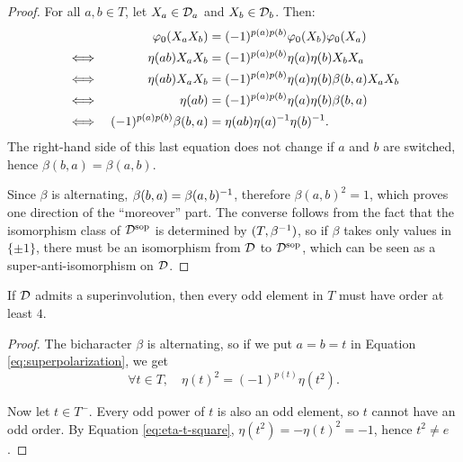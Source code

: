 \begin{proof}
    For all $a,b \in T$, let $X_a \in \mathcal{D}_a$ and $X_b\in \mathcal{D}_b$. Then:
    \begin{alignat*}{2}
        &&\varphi_0(X_a X_b) &= (-1)^{p(a) p(b)} \varphi_0(X_b) \varphi_0(X_a)\\
        \iff&&\,\, \eta(ab)X_a X_b &= (-1)^{p(a) p(b)} \eta(a) \eta(b) X_b X_a\\
        \iff&&\, \eta(ab)X_a X_b &= (-1)^{p(a) p(b)} \eta(a) \eta(b) \beta(b,a) X_a X_b\\
        \iff&& \eta(ab) &= (-1)^{p(a) p(b)} \eta(a) \eta(b) \beta(b,a)
        \\
        \iff&& (-1)^{p(a) p(b)} \beta(b, a) &=  \eta(ab) \eta(a)^{-1} \eta(b)^{-1}.
    \end{alignat*}
    The right-hand side of this last equation does not change if $a$ and $b$ are switched, hence $\beta(b,a) = \beta(a,b)$. 
    
    Since $\beta$ is alternating, $\beta(b, a) = \beta (a, b)^{-1}$, therefore $\beta(a,b)^2 = 1$, which proves one direction of the ``moreover'' part.
    The converse follows from the fact that the isomorphism class of $\mathcal{D}^{\mathrm{sop}}$ is determined by $(T, \beta^{-1})$, so if $\beta$ takes only values in $\{ \pm 1 \}$, there must be an isomorphism from $\mathcal{D}$ to $\mathcal{D}^{\mathrm{sop}}$, which can be seen as a super-anti-isomorphism on $\mathcal{D}$.
\end{proof}

\begin{cor}\label{cor:odd-cant-have-order-2}
    If $\mathcal{D}$ admits a superinvolution, %
    then every odd element in $T$ must have order at least $4$.
\end{cor}

\begin{proof}
    The bicharacter $\beta$ is alternating, so if we put $a = b = t$ in Equation \eqref{eq:superpolarization}, we get
    \begin{equation}\label{eq:eta-t-square}
        \forall t\in T, \quad \eta (t)^2 = (-1)^{p(t)} \eta(t^2).
    \end{equation}
    
    Now let $t\in T^-$. 
    Every odd power of $t$ is also an odd element, so $t$ cannot have an odd order. 
    By Equation \eqref{eq:eta-t-square}, $\eta (t^2) = - \eta(t)^2 = -1$, hence $t^2 \neq e$.
\end{proof}


